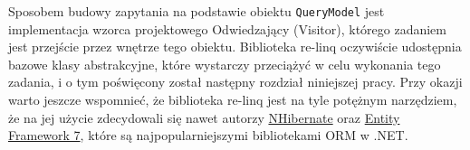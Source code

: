 Sposobem budowy zapytania na podstawie obiektu \texttt{QueryModel} jest implementacja wzorca projektowego Odwiedzający (Visitor), którego zadaniem jest przejście przez wnętrze tego obiektu. Biblioteka re-linq oczywiście udostępnia bazowe klasy abstrakcyjne, które wystarczy przeciążyć w celu wykonania tego zadania, i o tym poświęcony został następny rozdział niniejszej pracy. Przy okazji warto jeszcze wspomnieć, że biblioteka re-linq jest na tyle potężnym narzędziem, że na jej użycie zdecydowali się nawet autorzy \href{https://github.com/nhibernate/nhibernate-core/blob/d82d1381fb6b427da91d357398502a7f4b482ccc/src/NHibernate/Linq/NhRelinqQueryParser.cs}{NHibernate} oraz \href{https://github.com/aspnet/EntityFramework/blob/f386095005e46ea3aa4d677e4439cdac113dbfb1/src/EFCore.Relational/Query/ExpressionVisitors/Internal/EqualityPredicateExpandingVisitor.cs}{Entity Framework 7}, które są najpopularniejszymi bibliotekami ORM w .NET.